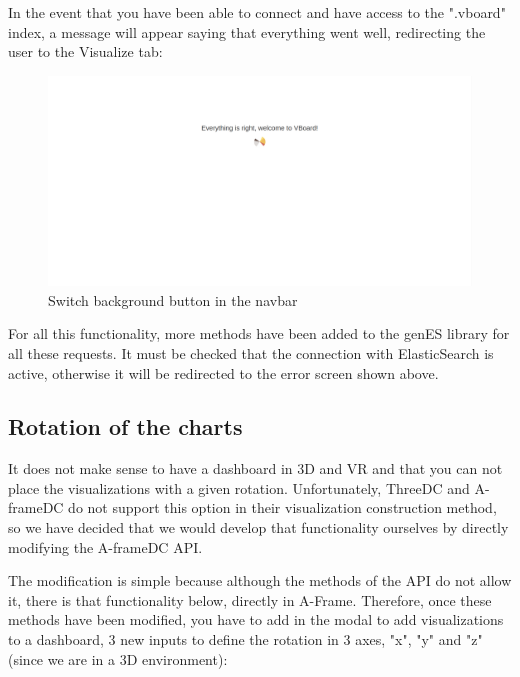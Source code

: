 \documentclass[a4paper, 12pt]{book}
\begin{document}
In the event that you have been able to connect and have access to the ".vboard" index, a message will appear saying that everything went well, redirecting the user to the Visualize tab:

\begin{figure}[H]
  \centering
  \includegraphics[width=16cm, keepaspectratio]{img/development/msgright}
  \caption{Switch background button in the navbar}
  \label{fig:examplestandalone}
\end{figure}

For all this functionality, more methods have been added to the genES library for all these requests. It must be checked that the connection with ElasticSearch is active, otherwise it will be redirected to the error screen shown above.

\subsection{Rotation of the charts}

It does not make sense to have a dashboard in 3D and VR and that you can not place the visualizations with a given rotation. Unfortunately, ThreeDC and A-frameDC do not support this option in their visualization construction method, so we have decided that we would develop that functionality ourselves by directly modifying the A-frameDC API.

The modification is simple because although the methods of the API do not allow it, there is that functionality below, directly in A-Frame. Therefore, once these methods have been modified, you have to add in the modal to add visualizations to a dashboard, 3 new inputs to define the rotation in 3 axes, "x", "y" and "z" (since we are in a 3D environment):
\end{document}
